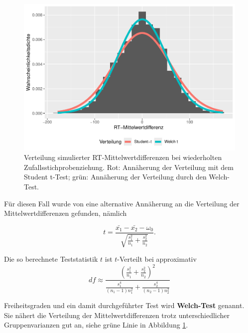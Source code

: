 \documentclass[
]{book}
\theoremstyle{definition}
\theoremstyle{definition}
\theoremstyle{definition}
\theoremstyle{definition}
\theoremstyle{remark}
\begin{document}
\begin{figure}

{\centering \includegraphics{aps_statistik1_files/figure-latex/exm-emotional-stroop-hist-1} 

}

\caption{Verteilung simulierter RT-Mittelwertdifferenzen bei wiederholten Zufallsstichprobenziehung. Rot: Annäherung der Verteilung mit dem Student t-Test; grün: Annäherung der Verteilung durch den Welch-Test.}\label{fig:exm-emotional-stroop-hist}
\end{figure}

Für diesen Fall wurde von \citet{welch1947} eine alternative Annäherung an die Verteilung der Mittelwertdifferenzen gefunden, nämlich

\begin{equation}
t = \frac{\bar{x_1}-\bar{x_2} - \omega_0}{\sqrt{\frac{s_1^2}{n_1}+\frac{s_2^2}{n_2}}}.
\label{eq:t-emp-twosample-welch}
\end{equation}

Die so berechnete Teststatistik \(t\) ist \(t\)-Verteilt bei approximativ
\[df \approx\frac{\left(\frac{s_1^2}{n_1}+\frac{s_2^2}{n_2}\right)^2}{\frac{s_1^4}{(n_1-1) n_1^2}+ \frac{s_2^4}{(n_2-1) n_2^2}}  \]

\label{customdef-welch-test}{Freiheitsgraden und ein damit durchgeführter Test wird \textbf{Welch-Test} genannt.} Sie nähert die Verteilung der Mittelwertdifferenzen trotz unterschiedlicher Gruppenvarianzen gut an, siehe grüne Linie in Abbildung \ref{fig:exm-emotional-stroop-hist}.
\end{document}
